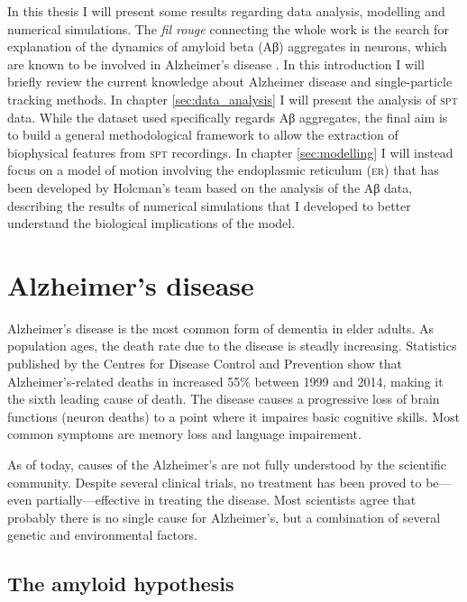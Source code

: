In this thesis I will present some results regarding data analysis, modelling and numerical simulations. The \textit{fil rouge} connecting the whole work is the search for explanation of the dynamics of amyloid beta (Aβ) aggregates in neurons, which are known to be involved in Alzheimer's disease . In this introduction I will briefly review the current knowledge about Alzheimer disease and single-particle tracking methods. In chapter \ref{sec:data_analysis} I will present the analysis of \textsc{spt} data. While the dataset used specifically regards Aβ aggregates, the final aim is to build a general methodological framework to allow the extraction of biophysical features from \textsc{spt} recordings. In chapter \ref{sec:modelling} I will instead focus on a model of motion involving the endoplasmic reticulum (\textsc{er}) that has been developed by Holcman's team  based on the analysis of the Aβ data, describing the results of numerical simulations that I developed to better understand the biological implications of the model.

\section{Alzheimer's disease}\label{sec:alzheimer}

Alzheimer’s disease is the most common form of dementia in elder adults. As population ages, the death rate due to the disease is steadly increasing. Statistics published by the Centres for Disease Control and Prevention show that Alzheimer’s-related deaths in  increased 55\% between 1999 and 2014, making it the sixth leading cause of death. The disease causes a progressive loss of brain functions (neuron deaths) to a point where it impaires basic cognitive skills. Most common symptoms are memory loss and language impairement.

As of today, causes of the Alzheimer’s are not fully understood by the scientific community. Despite several clinical trials, no treatment has been proved to be---even partially---effective in treating the disease. Most scientists agree that probably there is no single cause for Alzheimer’s, but a combination of several genetic and environmental factors.


\subsection{The amyloid hypothesis}

